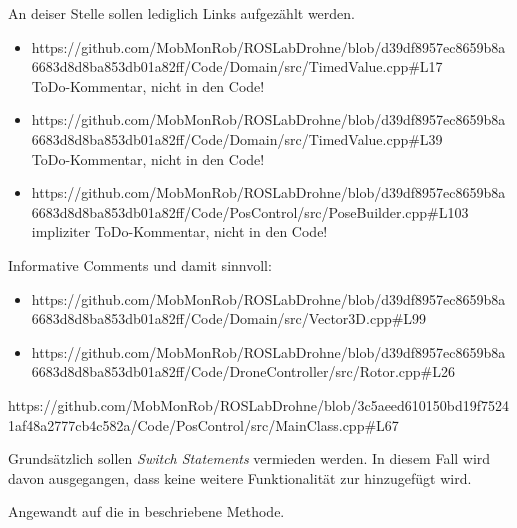An deiser Stelle sollen lediglich Links aufgezählt werden.
\begin{itemize}
\item https://github.com/MobMonRob/ROSLabDrohne/blob/d39df8957ec8659b8a6683d8d8ba853db01a82ff/Code/Domain/src/TimedValue.cpp\#L17\\
ToDo-Kommentar, nicht in den Code!

\item https://github.com/MobMonRob/ROSLabDrohne/blob/d39df8957ec8659b8a6683d8d8ba853db01a82ff/Code/Domain/src/TimedValue.cpp\#L39\\
ToDo-Kommentar, nicht in den Code!

\item https://github.com/MobMonRob/ROSLabDrohne/blob/d39df8957ec8659b8a6683d8d8ba853db01a82ff/Code/PosControl/src/PoseBuilder.cpp\#L103\\
impliziter ToDo-Kommentar, nicht in den Code!
\end{itemize}

Informative Comments und damit sinnvoll:
\begin{itemize}
\item https://github.com/MobMonRob/ROSLabDrohne/blob/d39df8957ec8659b8a6683d8d8ba853db01a82ff/Code/Domain/src/Vector3D.cpp\#L99
\item https://github.com/MobMonRob/ROSLabDrohne/blob/d39df8957ec8659b8a6683d8d8ba853db01a82ff/Code/DroneController/src/Rotor.cpp\#L26
\end{itemize}



https://github.com/MobMonRob/ROSLabDrohne/blob/3c5aeed610150bd19f75241af48a2777cb4c582a/Code/PosControl/src/MainClass.cpp\#L67
\\
 

Grundsätzlich sollen \textit{Switch Statements} vermieden werden.
In diesem Fall wird davon ausgegangen, dass keine weitere Funktionalität zur  hinzugefügt wird.






Angewandt auf die in  beschriebene Methode.\\
\\
 

